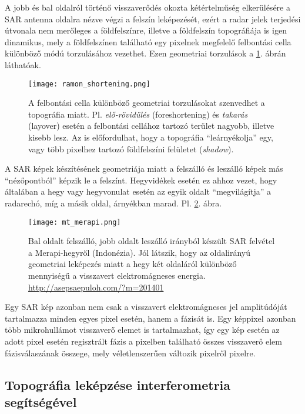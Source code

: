 \documentclass[12pt]{report}
\numberwithin{equation}{section}
\numberwithin{table}{section}
\numberwithin{figure}{section}
\begin{document}
A jobb és bal oldalról történő visszaverődés okozta kétértelműség elkerülésére a SAR antenna oldalra nézve végzi a felszín leképezését, ezért a radar jelek terjedési útvonala nem merőleges a földfelszínre, illetve a földfelszín topográfiája is igen dinamikus, mely a földfelszínen található egy pixelnek megfelelő felbontási cella különböző módú torzulásához vezethet. Ezen geometriai torzulások a \ref{ramon:shortening}. ábrán láthatóak.

\begin{figure}[H]
    \centering
    \texttt{[image: ramon\_shortening.png]}
    \caption{A felbontási cella különböző geometriai torzulásokat szenvedhet a topográfia miatt. Pl. \textit{elő-rövidülés} (foreshortening) és \textit{takarás} (layover) esetén a felbontási cellához tartozó terület nagyobb, illetve kisebb lesz. Az is előfordulhat, hogy a topográfia ``leárnyékolja'' egy, vagy több pixelhez tartozó földfelszíni felületet (\textit{shadow}). \cite{RamonHanssen}}\label{ramon:shortening}
\end{figure}

A SAR képek készítésének geometriája miatt a felszálló és leszálló képek más ``nézőpontból'' képzik le a felszínt. Hegyvidékek esetén ez ahhoz vezet, hogy általában a hegy vagy hegyvonulat esetén az egyik oldalt ``megvilágítja'' a radarechó, míg a másik oldal, árnyékban marad. Pl. \ref{merapi}. ábra.

\begin{figure}[H]
    \centering
    \texttt{[image: mt\_merapi.png]}
    \caption{Bal oldalt felszálló, jobb oldalt leszálló irányból készült SAR felvétel a Merapi-hegyről (Indonézia). Jól látszik, hogy az oldalirányú geometriai leképezés miatt a hegy két oldaláról különböző mennyiségű a visszavert elektromágneses energia. \url{http://asepsaepuloh.com/?m=201401}}\label{merapi}
\end{figure}

Egy SAR kép azonban nem csak a visszavert elektromágneses jel amplitúdóját tartalmazza minden egyes pixel esetén, hanem a fázisát is. Egy képpixel azonban több mikrohullámot visszaverő elemet is tartalmazhat, így egy kép esetén az adott pixel esetén regisztrált fázis a pixelben található összes visszaverő elem fázisválaszának összege, mely véletlenszerűen változik pixelről pixelre.

\subsection{Topográfia leképzése interferometria segítségével}
\end{document}
